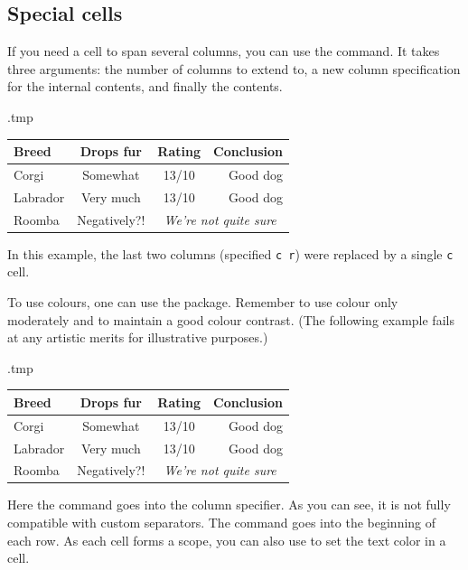 %
%
\subsection{Special cells}

If you need a cell to span several columns,
you can use the  command.
It takes three arguments: the number of columns to extend to,
a new column specification for the internal contents, and finally the contents.\label{ex:extrarowheight}
%
\begin{VerbatimOut}{\jobname.tmp}
\setlength\extrarowheight{2pt}
\centering
\begin{tabular}{l| c c @{ $\Rightarrow$ } r}
Breed & Drops fur & Rating & Conclusion\\
\hline
Corgi & Somewhat & 13/10 & Good dog\\
Labrador & Very much & 13/10 & Good dog\\
Roomba & Negatively?! &
    \multicolumn{2}{c}{\emph{We're not quite sure}}
\end{tabular}
\end{VerbatimOut}
\ShowExampleBelow
%
In this example, the last two columns (specified \verb|c r|)
were replaced by a single \verb|c| cell.

To use colours, one can use the  package.
Remember to use colour only moderately and to maintain a good colour contrast.
(The following example fails at any artistic merits for illustrative purposes.)
%
\begin{VerbatimOut}{\jobname.tmp}
\centering
\begin{tabular}{>{\columncolor{green!15}}l | c c @{ $\Rightarrow$ } r}
\rowcolor{blue!15} Breed & Drops fur & Rating & Conclusion\\
\hline
Corgi & Somewhat & 13/10 & Good dog\\
Labrador & Very much & 13/10 & Good dog\\
Roomba & \cellcolor{orange!20} Negatively?! &
    \multicolumn{2}{c}{\emph{We're not quite sure}}
\end{tabular}
\end{VerbatimOut}
\ShowExampleBelow
%
Here the  command goes into the column specifier.
As you can see, it is not fully compatible with custom separators.
The  command goes into the beginning of each row.
As each cell forms a scope, you can also use  to set the text color in a cell.

